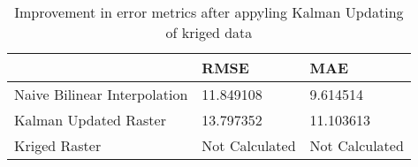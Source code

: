 \begin{table}
\caption{Improvement in error metrics after appyling Kalman Updating of kriged data}
\label{tab:big_island_lidar_error}
\begin{tabular}{lll}
\toprule
 & RMSE & MAE \\
\midrule
Naive Bilinear Interpolation & 11.849108 & 9.614514 \\
Kalman Updated Raster & 13.797352 & 11.103613 \\
Kriged Raster & Not Calculated & Not Calculated \\
\bottomrule
\end{tabular}
\end{table}

